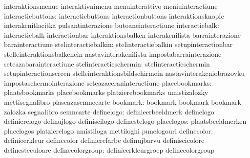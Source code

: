                                   interaktionsmenue                interaktivnimenu
                                  menuinterattivo                  meniuinteractiune
               interactiebuttons: interactiebuttons                interactionbuttons
                                  interaktionsknopfe               interakcnitlacitka
                                  pulsantinterazione               butoaneinteractiune
                  interactiebalk: interactiebalk                   interactionbar
                                  interaktionsbalken               interakcnilista
                                  barrainterazione                 barainteractiune
            stelinteractiebalkin: stelinteractiebalkin             setupinteractionbar
                                  stelleinteraktionsbalkenein      nastavinterakcnilistu
                                  impostabarrainterazione          seteazabarainteractiune
          stelinteractieschermin: stelinteractieschermin           setupinteractionscreen
                                  stelleinteraktionsbildschirmein  nastavinterakcniobrazovku
                                  impostaschermointerazione        seteazaecraninteractiune
                  placebookmarks: plaatsbookmarks                  placebookmarks
                                  platzierebookmarks               umistizalozky
                                  mettisegnalibro                  plaseazasemnecarte
                        bookmark: bookmark                         bookmark
                                  bookmark                         zalozka
                                  segnalibro                       semncarte
                      definelogo: definieerbeeldmerk               definelogo
                                  definierelogo                    definujlogo
                                  definiscilogo                    definestelogo
                      placelogos: plaatsbeeldmerken                placelogos
                                  platzierelogo                    umistiloga
                                  mettiloghi                       punelogouri
                    definecolor:  definieerkleur                   definecolor
                                  definierefarbe                   definujbarvu
                                  definiscicolore                  definesteculoare
               definecolorgroup:  definieerkleurgroep              definecolorgroup
